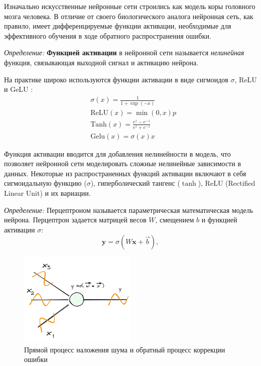 Изначально искусственные нейронные сети строились как модель коры головного мозга человека. 
В отличие от своего биологического аналога нейронная сеть, как правило, имеет дифференцируемые функции 
активации, необходимые для эффективного обучения в ходе обратного распространения ошибки.

\textit{Определение:} \textbf{Функцией активации} в нейронной сети называется \textit{нелинейная} функция,
связывающая выходной сигнал и активацию нейрона. 

На практике широко используются функции активации в виде сигмоидов $\sigma$, ReLU \cite{agarap2018deep} и 
GeLU \cite{hendrycks2016gaussian}:
\begin{equation}
  \begin{aligned}
    & \sigma(x) = \frac{1}{1+\exp(-x)} \\
    &\text{ReLU}(x) = \min(0,x)p \\
    &\text{Tanh}(x) = \frac{e^{z}-e^{-z}}{e^{z}+e^{-z}} \\
    &\text{Gelu}(x) = \sigma(x) x 
  \end{aligned}
\end{equation}

Функция активации вводится для добавления нелинейности в модель, что позволяет нейронной сети моделировать сложные 
нелинейные зависимости в данных. Некоторые из распространенных функций активации включают в себя сигмоидальную 
функцию (\( \sigma \)), гиперболический тангенс (\( \tanh \)), ReLU (Rectified Linear Unit) и их вариации.

\textit{Определение:} Перцептроном называется параметрическая математическая модель нейрона. Перцептрон
задается матрицей весов $W$, смещением $b$ и функцией активации $\sigma$:
\begin{equation}
  \mathbf{y} = \sigma(W \mathbf{x} + \vec{b}),
\end{equation}

\begin{figure}[h]
  \centering
  \includegraphics[width=0.5\textwidth]{assets/ml/nn/perceptron.excalidraw.png}
  \caption{Прямой процесс наложения шума и обратный процесс коррекции ошибки \cite{stablediffusion}}
  \label{perceptron}
\end{figure}

